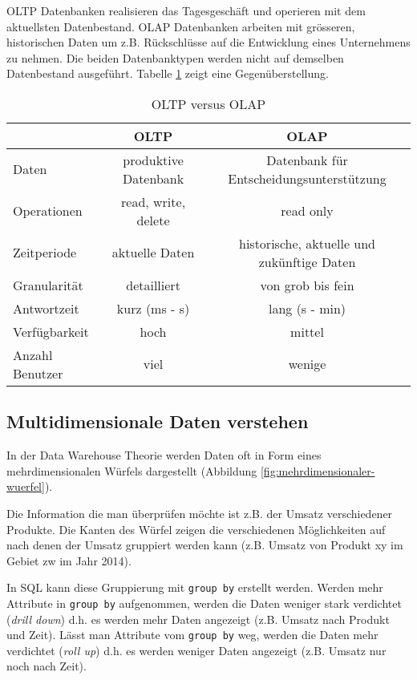 \ac{OLTP} Datenbanken realisieren das Tagesgeschäft und operieren mit dem aktuellsten Datenbestand. \ac{OLAP} Datenbanken arbeiten mit grösseren, historischen Daten um z.B. Rückschlüsse auf die Entwicklung eines Unternehmens zu nehmen. Die beiden Datenbanktypen werden nicht auf demselben Datenbestand ausgeführt. Tabelle \ref{tab:oltp-olap} zeigt eine Gegenüberstellung.

\begin{table}[h!]
	\centering
	\begin{tabular}{|l|c|c|}
		\hline  				& \ac{OLTP} 			& \ac{OLAP} 									\\ 
		\hline Daten 			& produktive Datenbank 	& Datenbank für Entscheidungsunterstützung 		\\ 
		\hline Operationen		& read, write, delete  	& read only 									\\
		\hline Zeitperiode 		& aktuelle Daten 		& historische, aktuelle und zukünftige Daten 	\\ 
		\hline Granularität 	& detailliert 			& von grob bis fein 							\\ 
		\hline Antwortzeit 		& kurz (ms - s) 		& lang (s - min) 								\\ 
		\hline Verfügbarkeit 	& hoch 					& mittel 										\\ 
		\hline Anzahl Benutzer 	& viel 					& wenige 										\\ 
		\hline 
	\end{tabular}
	\caption{OLTP versus OLAP}
	\label{tab:oltp-olap}
\end{table}

\subsection{Multidimensionale Daten verstehen}

In der Data Warehouse Theorie werden Daten oft in Form eines mehrdimensionalen Würfels dargestellt (Abbildung \ref{fig:mehrdimensionaler-wuerfel}).


Die Information die man überprüfen möchte ist z.B. der Umsatz verschiedener Produkte. Die Kanten des Würfel zeigen die verschiedenen Möglichkeiten auf nach denen der Umsatz gruppiert werden kann (z.B. Umsatz von Produkt xy im Gebiet zw im Jahr 2014). 

In SQL kann diese Gruppierung mit \verb|group by| erstellt werden. Werden mehr Attribute in \verb|group by| aufgenommen, werden die Daten weniger stark verdichtet (\emph{drill down}) d.h. es werden mehr Daten angezeigt (z.B. Umsatz nach Produkt und Zeit). Lässt man Attribute vom \verb|group by| weg, werden die Daten mehr verdichtet (\emph{roll up}) d.h. es werden weniger Daten angezeigt (z.B. Umsatz nur noch nach Zeit).

